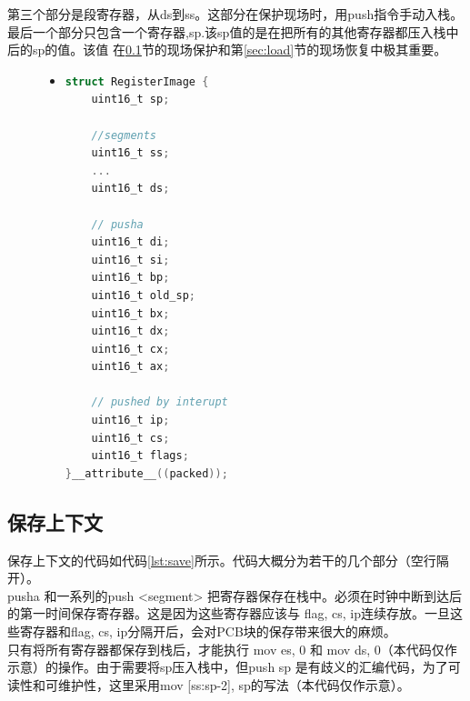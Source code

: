 \documentclass[a4paper]{article}
\begin{document}
    第三个部分是段寄存器，从ds到ss。这部分在保护现场时，用push指令手动入栈。\\ 

    最后一个部分只包含一个寄存器,sp.该sp值的是在把所有的其他寄存器都压入栈中后的sp的值。该值
    在\ref{sec:save}节的现场保护和第\ref{sec:load}节的现场恢复中极其重要。
    \begin{figure}[!hbt]
    \begin{itemize}
    \item[] \begin{lstlisting}[language=C, label=lst:PCB, caption=PCB寄存器映像]
struct RegisterImage {
    uint16_t sp;

    //segments
    uint16_t ss;
    ...
    uint16_t ds;

    // pusha
    uint16_t di;
    uint16_t si;
    uint16_t bp;
    uint16_t old_sp;
    uint16_t bx;
    uint16_t dx;
    uint16_t cx;
    uint16_t ax;

    // pushed by interupt
    uint16_t ip;
    uint16_t cs;
    uint16_t flags;
}__attribute__((packed));
    \end{lstlisting}
    \end{itemize}
    \end{figure}

    \subsection{保存上下文}\label{sec:save}
    保存上下文的代码如代码\ref{lst:save}所示。代码大概分为若干的几个部分（空行隔开）。\\ 

    pusha 和一系列的push <segment> 把寄存器保存在栈中。必须在时钟中断到达后的第一时间保存寄存器。这是因为这些寄存器应该与
    flag, cs, ip连续存放。一旦这些寄存器和flag, cs, ip分隔开后，会对PCB块的保存带来很大的麻烦。\\ 

    只有将所有寄存器都保存到栈后，才能执行 mov es, 0 和 mov ds, 0（本代码仅作示意）的操作。由于需要将sp压入栈中，但push sp
    是有歧义的汇编代码，为了可读性和可维护性，这里采用mov [ss:sp-2], sp的写法（本代码仅作示意）。\\ 
\end{document}
